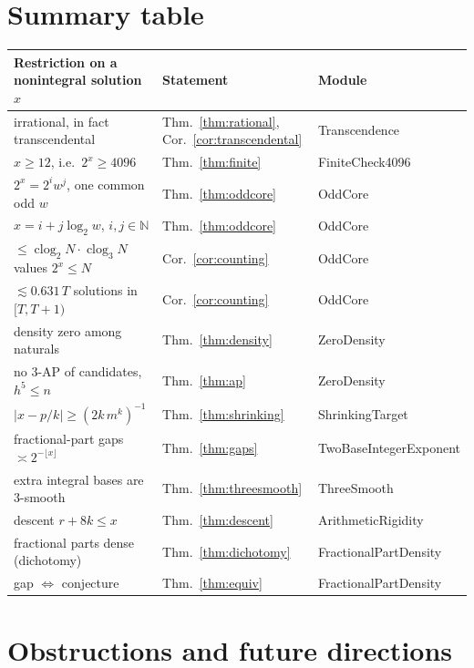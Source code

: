 \documentclass[11pt]{article}
\theoremstyle{definition}
\theoremstyle{remark}
\newcommand{\N}{\mathbb{N}}
\newcommand{\clog}{\operatorname{clog}}
\begin{document}
\section{Summary table}\label{sec:table}

\begin{center}
\small
\begin{tabular}{@{}lll@{}}
\toprule
Restriction on a nonintegral solution $x$ & Statement & Module \\
\midrule
irrational, in fact transcendental & Thm.~\ref{thm:rational}, Cor.~\ref{cor:transcendental} & Transcendence \\
$x\ge 12$, i.e.\ $2^x\ge 4096$ & Thm.~\ref{thm:finite} & FiniteCheck4096 \\
$2^x=2^i w^j$, one common odd $w$ & Thm.~\ref{thm:oddcore} & OddCore \\
$x=i+j\log_2 w$, $i,j\in\N$ & Thm.~\ref{thm:oddcore} & OddCore \\
$\le \clog_2 N\cdot \clog_3 N$ values $2^x\le N$ & Cor.~\ref{cor:counting} & OddCore \\
$\lesssim 0.631\,T$ solutions in $[T,T+1)$ & Cor.~\ref{cor:counting} & OddCore \\
density zero among naturals & Thm.~\ref{thm:density} & ZeroDensity \\
no $3$-AP of candidates, $h^5\le n$ & Thm.~\ref{thm:ap} & ZeroDensity \\
$|x-p/k|\ge (2k\,m^k)^{-1}$ & Thm.~\ref{thm:shrinking} & ShrinkingTarget \\
fractional-part gaps $\asymp 2^{-\lfloor x\rfloor}$ & Thm.~\ref{thm:gaps} & TwoBaseIntegerExponent \\
extra integral bases are $3$-smooth & Thm.~\ref{thm:threesmooth} & ThreeSmooth \\
descent $r+8k\le x$ & Thm.~\ref{thm:descent} & ArithmeticRigidity \\
fractional parts dense (dichotomy) & Thm.~\ref{thm:dichotomy} & FractionalPartDensity \\
gap $\Leftrightarrow$ conjecture & Thm.~\ref{thm:equiv} & FractionalPartDensity \\
\bottomrule
\end{tabular}
\end{center}

\section{Obstructions and future directions}\label{sec:directions}
\end{document}
